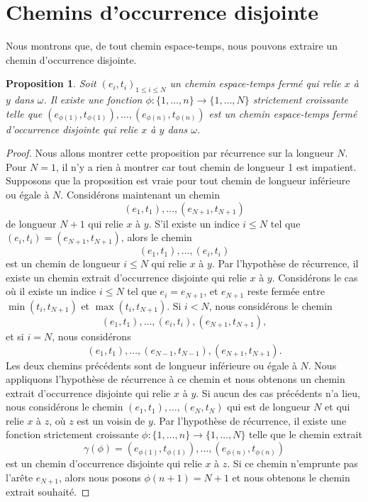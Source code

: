 \documentclass[titlepage,a4paper,12pt]{article}
\newcounter{d}
\newcounter{t}
\newcounter{p}
\newcounter{c}
\newcounter{a}
\newcounter{l}
\newtheorem{prop}[p]{Proposition}
\begin{document}
\section{Chemins d'occurrence disjointe}
Nous montrons que, de tout chemin espace-temps, nous pouvons extraire un chemin d'occurrence disjointe.
\begin{prop} \label{ocdis}
Soit $(e_i,t_i)_{1\leqslant i \leqslant N}$ un chemin espace-temps fermé qui relie $x$ à $y$ dans $\omega$. Il existe une fonction $\phi: \{1,\dots, n\}\rightarrow \{1,\dots, N\}$ strictement croissante telle que $(e_{\phi(1)},t_{\phi(1)}),\dots,(e_{\phi(n)},t_{\phi(n)})$ est un chemin espace-temps fermé d'occurrence disjointe qui relie $x$ à $y$ dans $\omega$.
\end{prop}
\begin{proof}
Nous allons montrer cette proposition par récurrence sur la longueur $N$. Pour $N=1$, il n'y a rien à montrer car tout chemin de longueur 1 est impatient. Supposons que la proposition est vraie pour tout chemin de longueur inférieure ou égale à $N$. Considérons maintenant un chemin $$(e_1,t_1),\dots, (e_{N+1},t_{N+1})$$ de longueur $N+1$ qui relie $x$ à $y$. S'il existe un indice $i\leqslant N$ tel que $(e_i,t_i) = (e_{N+1},t_{N+1})$, alors le chemin $$(e_1,t_1),\dots,(e_i,t_i)
$$ est un chemin de longueur $i\leqslant N$ qui relie $x$ à $y$. Par l'hypothèse de récurrence, il existe un chemin extrait d'occurrence disjointe qui relie $x$ à $y$. Considérons le cas où il existe un indice $i\leqslant N$ tel que $e_i = e_{N+1}$, et $e_{N+1}$ reste fermée entre $\min(t_i,t_{N+1})$ et $\max(t_i,t_{N+1})$. Si $i< N$, nous considérons le chemin $$(e_1,t_1), \dots, (e_{i},t_{i}), (e_{N+1},t_{N+1}),$$ et si $i=N$, nous considérons
$$ (e_1,t_1),\dots, (e_{N-1},t_{N-1}),(e_{N+1},t_{N+1}).
$$Les deux chemins précédents sont de longueur inférieure ou égale à $N$. Nous appliquons l'hypothèse de récurrence à ce chemin et nous obtenons un chemin extrait d'occurrence disjointe qui relie $x$ à $y$. Si aucun des cas précédents n'a lieu, nous considérons le chemin $(e_1,t_1),\dots,(e_N,t_N)$ qui est de longueur $N$ et qui relie $x$ à $z$, où $z$ est un voisin de $y$. Par l'hypothèse de récurrence, il existe une fonction strictement croissante $\phi:\{1,\dots,n\}\rightarrow \{1,\dots, N\}$ telle que le chemin extrait $$\gamma(\phi) = (e_{\phi(1)},t_{\phi(1)}),\dots,(e_{\phi(n)},t_{\phi(n)})$$ est un chemin d'occurrence disjointe qui relie $x$ à $z$. 
Si ce chemin n'emprunte pas l'arête $e_{N+1}$, alors nous posons $\phi(n+1) = N+1$ et nous obtenons le chemin extrait souhaité.

\end{proof}
\end{document}
